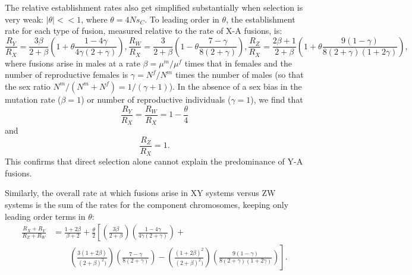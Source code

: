 \documentclass[12pt,twoside]{article}
\begin{document}
The relative establishment rates also get simplified substantially when selection is very weak: $|\theta| << \text{1}$, where $\theta=\text{4}Ns_C$. To leading order in $\theta$, the establishment rate for each type of fusion, measured relative to the rate of X-A fusions, is:
\begin{subequations}
\begin{equation}
\frac{R_Y}{R_X} = \frac{\text{3}\beta}{\text{2} +\beta} \left(\text{1} + \theta \frac{\text{1} - \text{4}\gamma}{\text{4}\gamma(\text{2}+\gamma)} \right),
\end{equation}
\begin{equation}
\frac{R_W}{R_X} = \frac{\text{3}}{\text{2} +\beta} \left(\text{1} - \theta \frac{\text{7} - \gamma}{\text{8}(\text{2}+\gamma)} \right),
\end{equation}
\begin{equation}
\frac{R_Z}{R_X} = \frac{\text{2}\beta + \text{1}}{\text{2} +\beta} \left(\text{1} + \theta \frac{\text{9}(\text{1} - \gamma)}{\text{8}(\text{2}+\gamma)(\text{1}+\text{2}\gamma)} \right),
\end{equation}
\end{subequations}
where fusions arise in males at a rate $\beta=\mu^m/\mu^f$ times that in females and the number of reproductive females is $\gamma=N^f/N^m$ times the number of males (so that the sex ratio $N^m/(N^m + N^f) = \text{1}/(\gamma + 1)$). In the absence of a sex bias in the mutation rate ($\beta=\text{1}$) or number of reproductive individuals ($\gamma=\text{1}$), we find that 
\[\frac{R_Y}{R_X}=\frac{R_W}{R_X}=\text{1} - \frac{\theta}{\text{4}} \]
and 
\[\frac{R_Z}{R_X} = \text{1}.\]
This confirms that direct selection alone cannot explain the predominance of Y-A fusions. 

Similarly, the overall rate at which fusions arise in XY systems versus ZW systems is the sum of the rates for the component chromosomes, keeping only leading order terms in $\theta$:
\begin{align}
\frac{R_X + R_Y}{R_Z + R_W} &= \frac{\text{1}+\text{2}\beta}{\beta + \text{2}} 
+ \frac{\theta}{\text{2}} \left[ \left(\frac{\text{3}\beta}{\text{2} + \beta} \right)
\left(\frac{\text{1}-\text{4}\gamma}{\text{4}\gamma(\text{2}+\gamma)}\right) +  \right. \nonumber \\
&\qquad \left.
\left(\frac{\text{3}(\text{1}+\text{2}\beta)}{(\text{2}+\beta)^\text{2})} \right)
\left(\frac{\text{7}-\gamma}{\text{8}(\text{2}+\gamma)} \right) - 
\left(\frac{(\text{1}+\text{2}\beta)^\text{2}}{(\text{2}+\beta)^\text{2})} \right)
\left(\frac{\text{9}(\text{1}-\gamma)}{\text{8}(\text{2}+\gamma)(\text{1}+\text{2}\gamma)} \right) \right].
\end{align}
\end{document}
